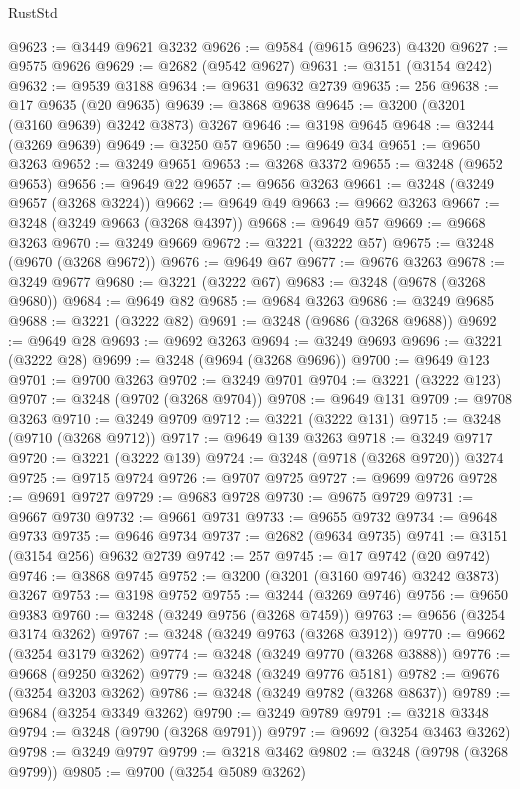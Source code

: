 \begin{lexlean}{RustStd}
\begin{coremodule}
{\begin{coremodule}
{{{{{{{{{{{{{{{{{{{{{{{{{@9623 := @3449 @9621 @3232
@9626 := @9584 (@9615 @9623) @4320
@9627 := @9575 @9626
@9629 := @2682 (@9542 @9627)
@9631 := @3151 (@3154 @242)
@9632 := @9539 @3188
@9634 := @9631 @9632 @2739
@9635 := 256
@9638 := @17 @9635 (@20 @9635)
@9639 := @3868 @9638
@9645 := @3200 (@3201 (@3160 @9639) @3242 @3873) @3267
@9646 := @3198 @9645
@9648 := @3244 (@3269 @9639)
@9649 := @3250 @57
@9650 := @9649 @34
@9651 := @9650 @3263
@9652 := @3249 @9651
@9653 := @3268 @3372
@9655 := @3248 (@9652 @9653)
@9656 := @9649 @22
@9657 := @9656 @3263
@9661 := @3248 (@3249 @9657 (@3268 @3224))
@9662 := @9649 @49
@9663 := @9662 @3263
@9667 := @3248 (@3249 @9663 (@3268 @4397))
@9668 := @9649 @57
@9669 := @9668 @3263
@9670 := @3249 @9669
@9672 := @3221 (@3222 @57)
@9675 := @3248 (@9670 (@3268 @9672))
@9676 := @9649 @67
@9677 := @9676 @3263
@9678 := @3249 @9677
@9680 := @3221 (@3222 @67)
@9683 := @3248 (@9678 (@3268 @9680))
@9684 := @9649 @82
@9685 := @9684 @3263
@9686 := @3249 @9685
@9688 := @3221 (@3222 @82)
@9691 := @3248 (@9686 (@3268 @9688))
@9692 := @9649 @28
@9693 := @9692 @3263
@9694 := @3249 @9693
@9696 := @3221 (@3222 @28)
@9699 := @3248 (@9694 (@3268 @9696))
@9700 := @9649 @123
@9701 := @9700 @3263
@9702 := @3249 @9701
@9704 := @3221 (@3222 @123)
@9707 := @3248 (@9702 (@3268 @9704))
@9708 := @9649 @131
@9709 := @9708 @3263
@9710 := @3249 @9709
@9712 := @3221 (@3222 @131)
@9715 := @3248 (@9710 (@3268 @9712))
@9717 := @9649 @139 @3263
@9718 := @3249 @9717
@9720 := @3221 (@3222 @139)
@9724 := @3248 (@9718 (@3268 @9720)) @3274
@9725 := @9715 @9724
@9726 := @9707 @9725
@9727 := @9699 @9726
@9728 := @9691 @9727
@9729 := @9683 @9728
@9730 := @9675 @9729
@9731 := @9667 @9730
@9732 := @9661 @9731
@9733 := @9655 @9732
@9734 := @9648 @9733
@9735 := @9646 @9734
@9737 := @2682 (@9634 @9735)
@9741 := @3151 (@3154 @256) @9632 @2739
@9742 := 257
@9745 := @17 @9742 (@20 @9742)
@9746 := @3868 @9745
@9752 := @3200 (@3201 (@3160 @9746) @3242 @3873) @3267
@9753 := @3198 @9752
@9755 := @3244 (@3269 @9746)
@9756 := @9650 @9383
@9760 := @3248 (@3249 @9756 (@3268 @7459))
@9763 := @9656 (@3254 @3174 @3262)
@9767 := @3248 (@3249 @9763 (@3268 @3912))
@9770 := @9662 (@3254 @3179 @3262)
@9774 := @3248 (@3249 @9770 (@3268 @3888))
@9776 := @9668 (@9250 @3262)
@9779 := @3248 (@3249 @9776 @5181)
@9782 := @9676 (@3254 @3203 @3262)
@9786 := @3248 (@3249 @9782 (@3268 @8637))
@9789 := @9684 (@3254 @3349 @3262)
@9790 := @3249 @9789
@9791 := @3218 @3348
@9794 := @3248 (@9790 (@3268 @9791))
@9797 := @9692 (@3254 @3463 @3262)
@9798 := @3249 @9797
@9799 := @3218 @3462
@9802 := @3248 (@9798 (@3268 @9799))
@9805 := @9700 (@3254 @5089 @3262)
}}}}}}}}}}}}}}}}}}}}}}}}}
\end{coremodule}}
\end{coremodule}
\end{lexlean}

